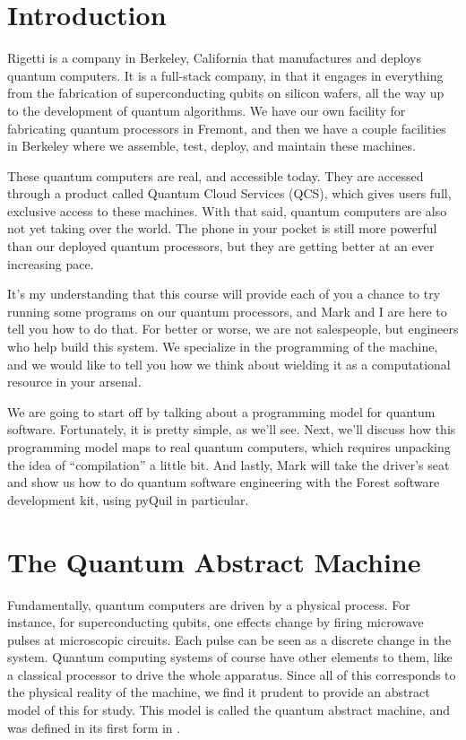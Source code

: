 \section{Introduction}

Rigetti is a company in Berkeley, California that manufactures and deploys quantum computers. It is a full-stack company, in that it engages in everything from the fabrication of superconducting qubits on silicon wafers, all the way up to the development of quantum algorithms. We have our own facility for fabricating quantum processors in Fremont, and then we have a couple facilities in Berkeley where we assemble, test, deploy, and maintain these machines.

These quantum computers are real, and accessible today. They are accessed through a product
called Quantum Cloud Services (QCS), which gives users full, exclusive access to these machines.
With that said, quantum computers are also not yet taking over the world. The phone in
your pocket is still more powerful than our deployed quantum processors, but they are getting
better at an ever increasing pace.

It's my understanding that this course will provide each of you a chance to try running some
programs on our quantum processors, and Mark and I are here to tell you how to do that.
For better or worse, we are not salespeople, but engineers who help build this system. We
specialize in the programming of the machine, and we would like to tell you how we think
about wielding it as a computational resource in your arsenal.

We are going to start off by talking about a programming model for quantum software.
Fortunately, it is pretty simple, as we'll see. Next, we'll discuss how this programming
model maps to real quantum computers, which requires unpacking the idea of ``compilation''
a little bit. And lastly, Mark will take the driver's seat and show us how to do quantum
software engineering with the Forest software development kit, using pyQuil in particular.

\section{The Quantum Abstract Machine}
Fundamentally, quantum computers are driven by a physical process. For instance, for
superconducting qubits, one effects change by firing microwave pulses at microscopic
circuits. Each pulse can be seen as a discrete change in the system. Quantum computing
systems of course have other elements to them, like a classical processor to drive the
whole apparatus. Since all of this corresponds to the physical reality of the machine,
we find it prudent to provide an abstract model of this for study. This model is called
the quantum abstract machine, and was defined in its first form in \cite{quilpaper}.

